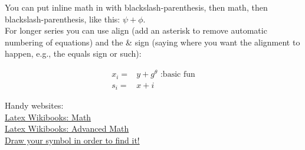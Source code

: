 \documentclass[11pt,a4paper,oneside]{article}
\begin{document}
You can put inline math in with blackslash-parenthesis, then math, then blackslash-parenthesis, like this: \(\psi+\phi\).\\

For longer series you can use align (add an asterisk to remove automatic numbering of equations) and the \& sign (saying where you want the alignment to happen, e.g., the equals sign or such):

\begin{align}
x_{i} =& y+g^{\theta} \text{   :basic fun} 
\\
s_{i} =& x+i
\end{align}

\noindent Handy websites:\\
\href {http://en.wikibooks.org/wiki/LaTeX/Mathematics}{Latex Wikibooks: Math}\\
\href{http://en.wikibooks.org/wiki/LaTeX/Advanced_Mathematics}{Latex Wikibooks: Advanced Math}\\
\href{http://detexify.kirelabs.org/classify.html}{Draw your symbol in order to find it!}
\end{document}
